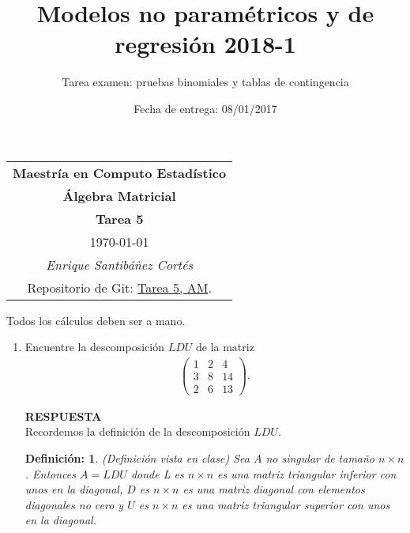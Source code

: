 \documentclass[11pt,letterpaper]{article}
\title{Modelos no paramétricos y de regresión 2018-1}
\author{Tarea examen: pruebas binomiales y tablas de contingencia}
\date{Fecha de entrega: 08/01/2017}
\newcommand{\res}{\textbf{RESPUESTA}\\}
\newtheorem{thmd}{Definición:}
\begin{document}
\begin{table}[ht]
\centering
\begin{tabular}{c}
\textbf{Maestría en Computo Estadístico}\\
\textbf{Álgebra Matricial} \\
\textbf{Tarea 5}\\
\today \\
\emph{Enrique Santibáñez Cortés}\\
Repositorio de Git: \href{https://github.com/Enriquesec/Algebra_matricial/tree/master/tareas/Tarea_5}{Tarea 5, AM}.
\end{tabular}
\end{table}
Todos los cálculos deben ser a mano.
\begin{enumerate}

\item Encuentre la descomposición $LDU$ de la matriz
\begin{align*}
\begin{pmatrix}
1 & 2 & 4\\
3 & 8 & 14\\
2 & 6 & 13
\end{pmatrix}.
\end{align*}

\res
Recordemos la definición de la descomposición $LDU$.
\begin{framed}
    \begin{thmd} \label{descompotition_LDU}
    (Definición vista en clase) Sea $A$ no singular de tamaño $n\times n$. Entonces $A=LDU$ donde L es $n\times n$ es una matriz triangular inferior con unos en la diagonal, $D$ es $n\times n$ es una matriz diagonal con elementos diagonales no cero y $U$ es $n\times n$ es una matriz triangular superior con unos en la diagonal.
    \end{thmd}
\end{framed} 


\end{enumerate}
\end{document}
